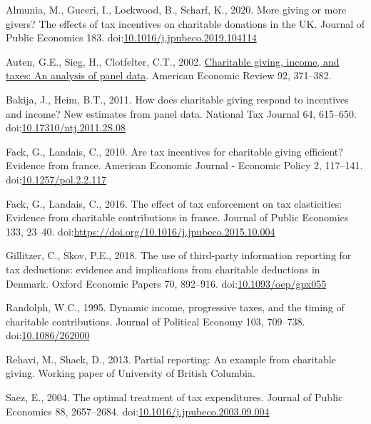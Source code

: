 \documentclass[
  11pt,
  a4paper,
]{article}
\newlength{\cslhangindent}
\newlength{\cslentryspacingunit} %
\newenvironment{CSLReferences}[2] %
 {%
  \setlength{\parindent}{0pt}
  \ifodd #1
  \let\oldpar\par
  \def\par{\hangindent=\cslhangindent\oldpar}
  \fi
  \setlength{\parskip}{#2\cslentryspacingunit}
 }%
 {}
\begin{document}
\hypertarget{refs}{}
\begin{CSLReferences}{1}{0}
\leavevmode{}%
Almunia, M., Guceri, I., Lockwood, B., Scharf, K., 2020. More giving or more givers? The effects of tax incentives on charitable donations in the UK. Journal of Public Economics 183. doi:\href{https://doi.org/10.1016/j.jpubeco.2019.104114}{10.1016/j.jpubeco.2019.104114}

\leavevmode{}%
Auten, G.E., Sieg, H., Clotfelter, C.T., 2002. \href{http://www.jstor.org/stable/3083340}{Charitable giving, income, and taxes: An analysis of panel data}. American Economic Review 92, 371--382.

\leavevmode{}%
Bakija, J., Heim, B.T., 2011. How does charitable giving respond to incentives and income? New estimates from panel data. National Tax Journal 64, 615--650. doi:\href{https://doi.org/10.17310/ntj.2011.2S.08}{10.17310/ntj.2011.2S.08}

\leavevmode{}%
Fack, G., Landais, C., 2010. Are tax incentives for charitable giving efficient? Evidence from france. American Economic Journal - Economic Policy 2, 117--141. doi:\href{https://doi.org/10.1257/pol.2.2.117}{10.1257/pol.2.2.117}

\leavevmode{}%
Fack, G., Landais, C., 2016. The effect of tax enforcement on tax elasticities: Evidence from charitable contributions in france. Journal of Public Economics 133, 23--40. doi:\url{https://doi.org/10.1016/j.jpubeco.2015.10.004}

\leavevmode{}%
Gillitzer, C., Skov, P.E., 2018. {The use of third-party information reporting for tax deductions: evidence and implications from charitable deductions in Denmark}. Oxford Economic Papers 70, 892--916. doi:\href{https://doi.org/10.1093/oep/gpx055}{10.1093/oep/gpx055}

\leavevmode{}%
Randolph, W.C., 1995. Dynamic income, progressive taxes, and the timing of charitable contributions. Journal of Political Economy 103, 709--738. doi:\href{https://doi.org/10.1086/262000}{10.1086/262000}

\leavevmode{}%
Rehavi, M., Shack, D., 2013. Partial reporting: An example from charitable giving. Working paper of University of British Columbia.

\leavevmode{}%
Saez, E., 2004. The optimal treatment of tax expenditures. Journal of Public Economics 88, 2657--2684. doi:\href{https://doi.org/10.1016/j.jpubeco.2003.09.004}{10.1016/j.jpubeco.2003.09.004}

\end{CSLReferences}
\end{document}
